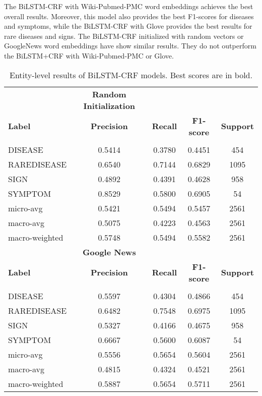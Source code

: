 \documentclass[preprint,12pt]{elsarticle}
\begin{document}
The BiLSTM-CRF with Wiki-Pubmed-PMC word embeddings achieves the best overall results. Moreover, this model also provides the best F1-scores for diseases and  symptoms, while the BiLSTM-CRF with Glove provides the best results for rare diseases and signs. 
The BiLSTM-CRF initialized with random vectors or GoogleNews word embeddings have  show similar results. They do not outperform the BiLSTM+CRF with  Wiki-Pubmed-PMC or Glove. 


\begin{table}[!htbp]
\centering
\small
\caption{\label{tab:bilstmcrf}Entity-level results of BiLSTM-CRF models. Best scores are in bold.}
\begin{tabular}{lcccc}
\\
& \multicolumn{1}{c}{\textbf{Random Initialization}} \\
{\bf Label} & {\bf Precision} &
{\bf Recall} &
{\bf F1-score} & {\bf Support} \\
\hline\\[-8pt]

DISEASE	&	0.5414	&	0.3780	&	0.4451	&	454\\
RAREDISEASE	&	0.6540	&	0.7144	&	0.6829	&	1095\\
SIGN	&	0.4892	&	0.4391	&	0.4628	&	958\\
SYMPTOM	&	0.8529	&	0.5800	&	0.6905	&	54\\
micro-avg	&	0.5421	&	0.5494	&	0.5457	&	2561\\
macro-avg	&	0.5075	&	0.4223	&	0.4563	&	2561\\
macro-weighted	&	0.5748	&	0.5494	&	0.5582	&	2561\\
\hline

& \multicolumn{1}{c}{\textbf{Google News}} \\
{\bf Label} & {\bf Precision} &
{\bf Recall} &
{\bf F1-score} & {\bf Support} \\
\hline\\[-8pt]

DISEASE	&	0.5597	&	0.4304	&	0.4866	&	454\\
RAREDISEASE	&	0.6482	&	0.7548	&	0.6975	&	1095\\
SIGN	&	0.5327	&	0.4166	&	0.4675	&	958\\
SYMPTOM	&	0.6667	&	0.5600	&	0.6087	&	54\\
micro-avg	&	0.5556	&	0.5654	&	0.5604	&	2561\\
macro-avg	&	0.4815	&	0.4324	&	0.4521	&	2561\\
macro-weighted	&	0.5887	&	0.5654	&	0.5711	&	2561\\



\end{tabular}
\end{table}
\end{document}
